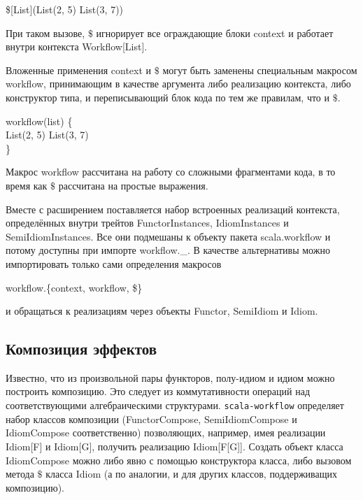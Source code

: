 \begin{haskell}
\$[List](List(2, 5) \times List(3, 7))
\end{haskell}

При таком вызове, $\$$ игнорирует все ограждающие блоки \<context\> и работает внутри контекста \<Workflow[List]\>.

Вложенные применения \<context\> и $\$$ могут быть заменены специальным макросом \<workflow\>, принимающим в качестве аргумента либо реализацию контекста, либо конструктор типа, и переписывающий блок кода по тем же правилам, что и $\$$.

\begin{haskell}
workflow(list) \{ \\
\quad\quad List(2, 5) \times List(3, 7) \\
\}
\end{haskell}

Макрос \<workflow\> рассчитана на работу со сложными фрагментами кода, в то время как $\$$ рассчитана на простые выражения.

Вместе с расширением поставляется набор встроенных реализаций контекста, определённых внутри трейтов \<FunctorInstances\>, \<IdiomInstances\> и \<SemiIdiomInstances\>. Все они подмешаны к объекту пакета \<scala.workflow\> и потому доступны при импорте \<workflow.\_\>. В качестве альтернативы можно импортировать только сами определения макросов
\begin{haskell}workflow.\{context, workflow, \$\}\end{haskell}
\hspace{0cm}и обращаться к реализациям через объекты \<Functor\>, \<SemiIdiom\> и \<Idiom\>.

\subsection{Композиция эффектов}
Известно, что из произвольной пары функторов, полу-идиом и идиом можно построить композицию. Это следует из коммутативности операций над соответствующими алгебраическими структурами. \texttt{scala-workflow} оп\-ределяет набор классов композиции (\<FunctorCompose\>, \<SemiIdiomCompose\> и \<IdiomCompose\> соответственно) позволяющих, например, имея реализации \<Idiom[F]\> и \<Idiom[G]\>, получить реализацию \<Idiom[F[G]]\>. Создать объект класса \<IdiomCompose\> можно либо явно с помощью конструктора класса, либо вызовом метода $\$$ класса \<Idiom\> (а по аналогии, и для других классов, поддерживащих композицию).

